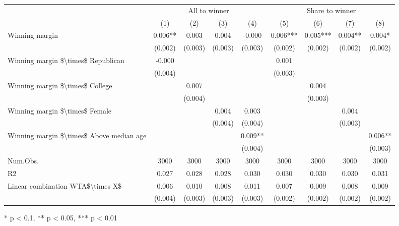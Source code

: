 \begin{table}[t]
\fontsize{12.0pt}{14.4pt}\selectfont
\begin{tabular*}{\linewidth}{@{\extracolsep{\fill}}lcccccccc}
\toprule
 & \multicolumn{4}{c}{All to winner} & \multicolumn{4}{c}{Share to winner} \\ 
\cmidrule(lr){2-5} \cmidrule(lr){6-9}
  & (1) & (2) & (3) & (4) & (5) & (6) & (7) & (8) \\ 
\midrule\addlinespace[2.5pt]
Winning margin & 0.006** & 0.003 & 0.004 & -0.000 & 0.006*** & 0.005*** & 0.004** & 0.004* \\ 
 & (0.002) & (0.003) & (0.003) & (0.003) & (0.002) & (0.002) & (0.002) & (0.002) \\ 
Winning margin \$\textbackslash{}times\$ Republican & -0.000 &  &  &  & 0.001 &  &  &  \\ 
 & (0.004) &  &  &  & (0.003) &  &  &  \\ 
Winning margin \$\textbackslash{}times\$ College &  & 0.007 &  &  &  & 0.004 &  &  \\ 
 &  & (0.004) &  &  &  & (0.003) &  &  \\ 
Winning margin \$\textbackslash{}times\$ Female &  &  & 0.004 & 0.003 &  &  & 0.004 &  \\ 
 &  &  & (0.004) & (0.004) &  &  & (0.003) &  \\ 
Winning margin \$\textbackslash{}times\$ Above median age &  &  &  & 0.009** &  &  &  & 0.006** \\ 
{} & {} & {} & {} & {(0.004)} & {} & {} & {} & {(0.003)} \\ 
Num.Obs. & 3000 & 3000 & 3000 & 3000 & 3000 & 3000 & 3000 & 3000 \\ 
R2 & 0.027 & 0.028 & 0.028 & 0.030 & 0.030 & 0.030 & 0.030 & 0.031 \\ 
Linear combination WTA\$\textbackslash{}times X\$ & 0.006 & 0.010 & 0.008 & 0.011 & 0.007 & 0.009 & 0.008 & 0.009 \\ 
 & (0.004) & (0.003) & (0.003) & (0.003) & (0.002) & (0.002) & (0.002) & (0.002) \\ 
\bottomrule
\end{tabular*}
\begin{minipage}{\linewidth}
* p < 0.1, ** p < 0.05, *** p < 0.01\\
\end{minipage}
\end{table}

